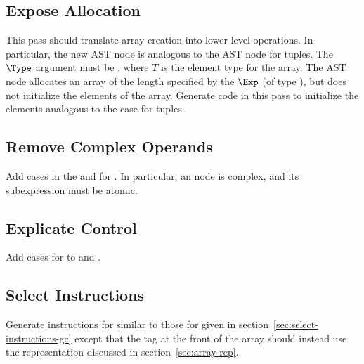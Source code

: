\documentclass[7x10]{TimesAPriori_MIT}%
\numberwithin{theorem}{chapter}
\numberwithin{definition}{chapter}
\numberwithin{equation}{chapter}
\begin{document}

\subsection{Expose Allocation}

This pass should translate array creation into lower-level
operations. In particular, the new AST node \ALLOCARRAY{\Exp}{\Type}
is analogous to the  AST node for tuples.  The $\Type$
argument must be , where $T$ is the element type for the
array. The  AST node allocates an array of the
length specified by the $\Exp$ (of type \INTTY), but does not
initialize the elements of the array. Generate code in this pass to
initialize the elements analogous to the case for tuples.

\subsection{Remove Complex Operands}

Add cases in the  and  for
. In particular, an  node is
complex, and its subexpression must be atomic.

\subsection{Explicate Control}

Add cases for  to  and
.

\subsection{Select Instructions}

Generate instructions for  similar to those for
 given in section~\ref{sec:select-instructions-gc}
except that the tag at the front of the array should instead use the
representation discussed in section~\ref{sec:array-rep}.
\end{document}
